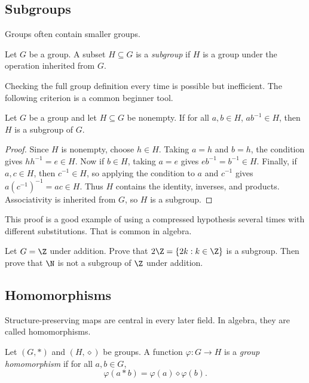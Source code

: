 \subsection{Subgroups}

Groups often contain smaller groups.

\begin{definition}
Let $G$ be a group. A subset $H\subseteq G$ is a \emph{subgroup} if $H$ is a
group under the operation inherited from $G$.
\end{definition}

Checking the full group definition every time is possible but inefficient. The
following criterion is a common beginner tool.

\begin{theorem}
Let $G$ be a group and let $H\subseteq G$ be nonempty. If for all $a,b\in H$,
$ab^{-1}\in H$, then $H$ is a subgroup of $G$.
\end{theorem}

\begin{proof}
Since $H$ is nonempty, choose $h\in H$. Taking $a=h$ and $b=h$, the condition
gives $hh^{-1}=e\in H$. Now if $b\in H$, taking $a=e$ gives
$eb^{-1}=b^{-1}\in H$. Finally, if $a,c\in H$, then $c^{-1}\in H$, so applying
the condition to $a$ and $c^{-1}$ gives $a(c^{-1})^{-1}=ac\in H$. Thus $H$
contains the identity, inverses, and products. Associativity is inherited from
$G$, so $H$ is a subgroup.
\end{proof}

This proof is a good example of using a compressed hypothesis several times with
different substitutions. That is common in algebra.

\begin{labbox}
Let $G=\Z$ under addition. Prove that $2\Z=\{2k:k\in\Z\}$ is a subgroup. Then
prove that $\N$ is not a subgroup of $\Z$ under addition.
\end{labbox}

\subsection{Homomorphisms}

Structure-preserving maps are central in every later field. In algebra, they
are called homomorphisms.

\begin{definition}
Let $(G,\ast)$ and $(H,\diamond)$ be groups. A function $\varphi:G\to H$ is a
\emph{group homomorphism} if for all $a,b\in G$,
\[
\varphi(a\ast b)=\varphi(a)\diamond\varphi(b).
\]
\end{definition}

